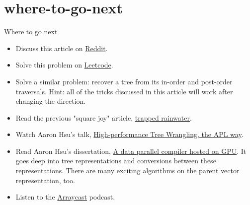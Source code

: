 \documentclass{article}
\begin{document}
\section{where-to-go-next}{Where to go next}
\begin{itemize}
  \item Discuss this article on \href{https://www.reddit.com/r/apljk/comments/v5cr09/blog_post_square_joy_preorder/}{Reddit}.
  \item Solve this problem on \href{https://leetcode.com/problems/construct-binary-tree-from-preorder-and-inorder-traversal/}{Leetcode}.
  \item
    Solve a similar problem: recover a tree from its in-order and post-order traversals.
    Hint: all of the tricks discussed in this article will work after changing the direction.
  \item Read the previous "square joy" article, \href{/posts/04-square-joy-trapped-rain-water.html}{trapped rainwater}.
  \item Watch Aaron Hsu's talk, \href{https://www.youtube.com/watch?v=hzPd3umu78g}{High-performance Tree Wrangling, the APL way}.
  \item Read Aaron Hsu's dissertation, \href{https://scholarworks.iu.edu/dspace/handle/2022/24749}{A data parallel compiler hosted on GPU}.
    It goes deep into tree representations and conversions between these representations.
    There are many exciting algorithms on the parent vector representation, too.
  \item Listen to the \href{https://arraycast.com/}{Arraycast} podcast.
\end{itemize}
\end{document}
